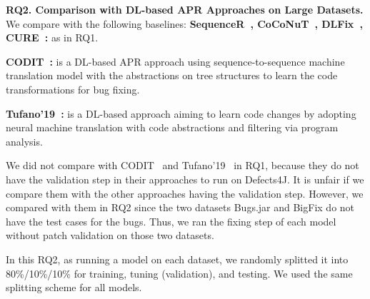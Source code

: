 {\bf RQ2. Comparison with DL-based APR Approaches on
  Large Datasets.} We compare {\tool} with the following baselines:
{\bf Sequen\-ceR~\cite{chen2018sequencer},
  CoCoNuT~\cite{lutellier2020coconut}, DLFix~\cite{icse20},
  CURE~\cite{cure-icse21}:} as in RQ1.

{\bf CODIT~\cite{chakrabortycodit}:} is a DL-based APR approach
using sequence-to-sequence machine translation model with the
abstractions on tree structures to learn the code transformations for
bug fixing.

{\bf Tufano'19~\cite{tufano2019learning}:} is a DL-based approach
aiming to learn code changes by adopting neural machine translation
with code abstractions and filtering via program analysis.

We did not compare with CODIT~\cite{chakrabortycodit} and
Tufano'19~\cite{tufano2019learning} in RQ1, because they do not have
the validation step in their approaches to run on Defects4J. It is
unfair if we compare them with the other approaches having the
validation step. However, we compared {\tool} with them in RQ2
since the two datasets Bugs.jar and BigFix do not have the
test cases for the bugs. Thus, we ran the fixing step of each
model without patch validation on those two datasets.





In this RQ2, as running a model on each dataset, we randomly splitted
it into 80\%/10\%/10\% for training, tuning (validation), and
testing. We used the same splitting scheme for all models.


